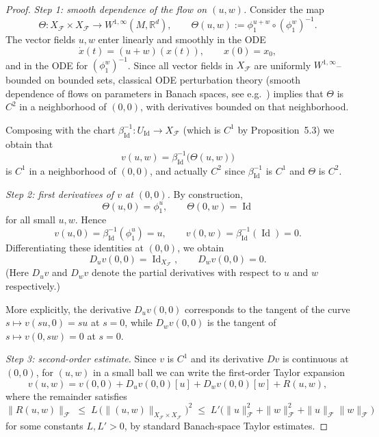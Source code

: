 \documentclass[12pt]{amsart}
\numberwithin{equation}{section}
\theoremstyle{remark}
\begin{document}
\begin{proof}
\medskip\noindent
\emph{Step 1: smooth dependence of the flow on $(u,w)$.}
Consider the map
\[
  \Theta : X_{\mathcal F}\times X_{\mathcal F}\to W^{1,\infty}(M,\mathbb R^d),
  \qquad
  \Theta(u,w) := \phi_1^{u+w}\circ(\phi_1^{w})^{-1}.
\]
The vector fields $u,w$ enter linearly and smoothly in the ODE
\[
  \dot x(t) = (u+w)(x(t)),\qquad x(0)=x_0,
\]
and in the ODE for $(\phi_1^{w})^{-1}$. Since all vector fields in
$X_{\mathcal F}$ are uniformly $W^{1,\infty}$--bounded on bounded sets,
classical ODE perturbation theory (smooth dependence of flows on
parameters in Banach spaces, see e.g.\ \cite[Ch.~III]{6}) implies that
$\Theta$ is $C^2$ in a neighborhood of $(0,0)$, with derivatives
bounded on that neighborhood.

Composing with the chart $\beta_{\operatorname{Id}}^{-1}:U_{\operatorname{Id}}\to X_{\mathcal F}$
(which is $C^1$ by Proposition~5.3) we obtain that
\[
  v(u,w)
  = \beta_{\operatorname{Id}}^{-1}\bigl(\Theta(u,w)\bigr)
\]
is $C^1$ in a neighborhood of $(0,0)$, and actually $C^2$ since
$\beta_{\operatorname{Id}}^{-1}$ is $C^1$ and $\Theta$ is $C^2$.

\medskip\noindent
\emph{Step 2: first derivatives of $v$ at $(0,0)$.}
By construction,
\[
  \Theta(u,0)=\phi_1^u,\qquad
  \Theta(0,w)=\operatorname{Id}
\]
for all small $u,w$. Hence
\[
  v(u,0)=\beta_{\operatorname{Id}}^{-1}(\phi_1^u)=u,\qquad
  v(0,w)=\beta_{\operatorname{Id}}^{-1}(\operatorname{Id})=0.
\]
Differentiating these identities at $(0,0)$, we obtain
\[
  D_u v(0,0) = \operatorname{Id}_{X_{\mathcal F}},\qquad
  D_w v(0,0) = 0.
\]
(Here $D_u v$ and $D_w v$ denote the partial derivatives with respect
to $u$ and $w$ respectively.)

More explicitly, the derivative $D_u v(0,0)$ corresponds to the
tangent of the curve $s\mapsto v(su,0)=su$ at $s=0$, while $D_w v(0,0)$
is the tangent of $s\mapsto v(0,sw)=0$ at $s=0$.

\medskip\noindent
\emph{Step 3: second-order estimate.}
Since $v$ is $C^1$ and its derivative $Dv$ is continuous at $(0,0)$,
for $(u,w)$ in a small ball we can write the first-order Taylor
expansion
\[
  v(u,w)
  = v(0,0) + D_u v(0,0)[u] + D_w v(0,0)[w] + R(u,w),
\]
where the remainder satisfies
\[
  \|R(u,w)\|_{\mathcal F}
  \;\le\; L\,\bigl(\|(u,w)\|_{X_{\mathcal F}\times X_{\mathcal F}}\bigr)^2
  \;\le\; L' \bigl(\|u\|_{\mathcal F}^2 + \|w\|_{\mathcal F}^2
                     + \|u\|_{\mathcal F}\|w\|_{\mathcal F}\bigr)
\]
for some constants $L,L'>0$, by standard Banach-space Taylor
estimates.


\end{proof}
\end{document}
